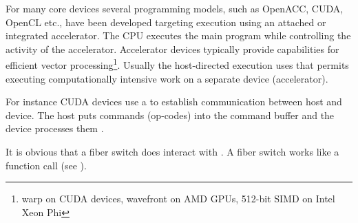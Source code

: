 
For many core devices several programming models, such as OpenACC, CUDA, OpenCL
etc., have been developed targeting  execution using an
attached or integrated accelerator. The CPU executes the main program while
controlling the activity of the accelerator. Accelerator devices typically
provide capabilities for efficient vector processing\footnote{warp on CUDA
devices, wavefront on AMD GPUs, 512-bit SIMD on Intel Xeon Phi}. Usually the
host-directed execution uses  that permits
executing computationally intensive work on a separate device
(accelerator)\cite{OpenAcc}.

For instance CUDA devices use a  to establish communication
between host and device. The host puts commands (op-codes) into the command
buffer and the device processes them \cite{CUDA}.

It is obvious that a fiber switch does  interact with
. A fiber switch works like a function
call (see ).

